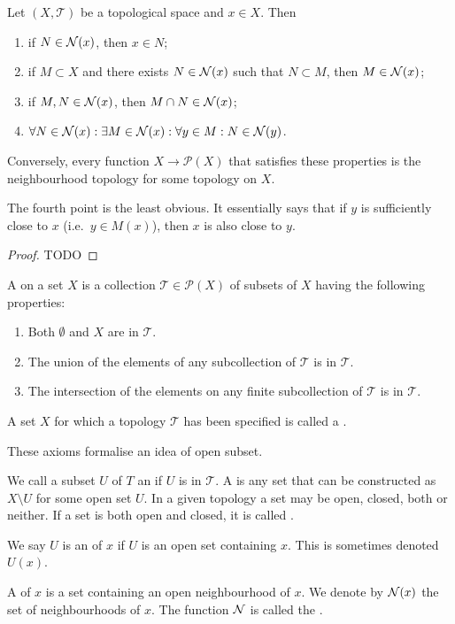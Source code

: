 \begin{proposition}
Let $(X,\mathcal{T})$ be a topological space and $x\in X$. Then
\begin{enumerate}
\item if $N\in\operatorname{\mathcal{N}}(x)$, then $x\in N$;
\item if $M\subset X$ and there exists $N\in\operatorname{\mathcal{N}}(x)$ such that $N\subset M$, then $M\in\operatorname{\mathcal{N}}(x)$;
\item if $M,N\in\operatorname{\mathcal{N}}(x)$, then $M\cap N\in\operatorname{\mathcal{N}}(x)$;
\item $\forall N\in\operatorname{\mathcal{N}}(x): \exists M\in\operatorname{\mathcal{N}}(x): \forall y\in M: N\in\operatorname{\mathcal{N}}(y)$.
\end{enumerate}
Conversely, every function $X\to \mathcal{P}(X)$ that satisfies these properties is the neighbourhood topology for some topology on $X$.
\end{proposition}
The fourth point is the least obvious. It essentially says that if $y$ is sufficiently close to $x$ (i.e.\ $y\in M(x)$), then $x$ is also close to $y$.
\begin{proof}
TODO
\end{proof}

\begin{definition}
A  on a set $X$ is a collection $\mathcal{T}\in \mathcal{P}(X)$ of subsets of $X$ having the following properties:
\begin{enumerate}
\item Both $\emptyset$ and $X$ are in $\mathcal{T}$.
\item The union of the elements of any subcollection of $\mathcal{T}$ is in $\mathcal{T}$.
\item The intersection of the elements on any finite subcollection of $\mathcal{T}$ is in $\mathcal{T}$.
\end{enumerate}
A set $X$ for which a topology $\mathcal{T}$ has been specified is called a .
\end{definition}
These axioms formalise an idea of open subset.
\begin{definition}
We call a subset $U$ of $T$ an  if $U$ is in $\mathcal{T}$. A  is any set that can be constructed as $X \setminus U$ for some open set $U$. In a given topology a set may be open, closed, both or neither. If a set is both open and closed, it is called .

We say $U$ is an  of $x$ if $U$ is an open set containing $x$. This is sometimes denoted $U(x)$.

A  of $x$ is a set containing an open neighbourhood of $x$. We denote by $\operatorname{\mathcal{N}}(x)$ the set of neighbourhoods of $x$. The function $\operatorname{\mathcal{N}}$ is called the .
\end{definition}


